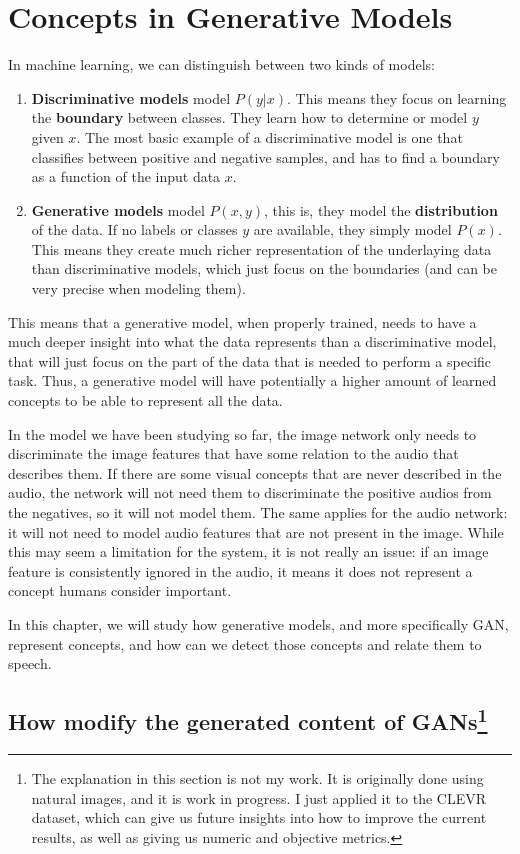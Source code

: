 \chapter{Concepts in Generative Models}

In machine learning, we can distinguish between two kinds of models:
\begin{enumerate}
    \item \textbf{Discriminative models} model $P(y|x)$. This means they focus on learning the \textbf{boundary} between classes. They learn how to determine or model $y$ given $x$. The most basic example of a discriminative model is one that classifies between positive and negative samples, and has to find a boundary as a function of the input data $x$.
    \item \textbf{Generative models} model $P(x,y)$, this is, they model the \textbf{distribution} of the data. If no labels or classes $y$ are available, they simply model $P(x)$. This means they create much richer representation of the underlaying data than discriminative models, which just focus on the boundaries (and can be very precise when modeling them). 
\end{enumerate}

This means that a generative model, when properly trained, needs to have a much deeper insight into what the data represents than a discriminative model, that will just focus on the part of the data that is needed to perform a specific task. Thus, a generative model will have potentially a higher amount of learned concepts to be able to represent all the data.

In the model we have been studying so far, the image network only needs to discriminate the image features that have some relation to the audio that describes them. If there are some visual concepts that are never described in the audio, the network will not need them to discriminate the positive audios from the negatives, so it will not model them. The same applies for the audio network: it will not need to model audio features that are not present in the image. While this may seem a limitation for the system, it is not really an issue: if an image feature is consistently ignored in the audio, it means it does not represent a concept humans consider important.

In this chapter, we will study how generative models, and more specifically \ac{GAN}, represent concepts, and how can we detect those concepts and relate them to speech.

\section{How modify the generated content of GANs\footnote{The explanation in this section is not my work. It is originally done using natural images, and it is work in progress. I just applied it to the CLEVR dataset, which can give us future insights into how to improve the current results, as well as giving us numeric and objective metrics.}}

